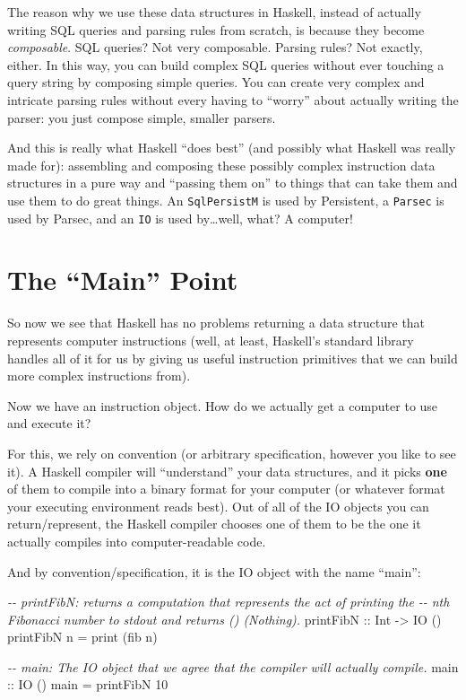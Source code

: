 \documentclass[]{article}
\newenvironment{Shaded}{}{}
\newcommand{\CommentTok}[1]{\textcolor[rgb]{0.38,0.63,0.69}{\textit{#1}}}
\newcommand{\DataTypeTok}[1]{\textcolor[rgb]{0.56,0.13,0.00}{#1}}
\newcommand{\DecValTok}[1]{\textcolor[rgb]{0.25,0.63,0.44}{#1}}
\newcommand{\FunctionTok}[1]{\textcolor[rgb]{0.02,0.16,0.49}{#1}}
\newcommand{\NormalTok}[1]{#1}
\newcommand{\OtherTok}[1]{\textcolor[rgb]{0.00,0.44,0.13}{#1}}
\begin{document}
The reason why we use these data structures in Haskell, instead of actually
writing SQL queries and parsing rules from scratch, is because they become
\emph{composable}. SQL queries? Not very composable. Parsing rules? Not exactly,
either. In this way, you can build complex SQL queries without ever touching a
query string by composing simple queries. You can create very complex and
intricate parsing rules without every having to ``worry'' about actually writing
the parser: you just compose simple, smaller parsers.

And this is really what Haskell ``does best'' (and possibly what Haskell was
really made for): assembling and composing these possibly complex instruction
data structures in a pure way and ``passing them on'' to things that can take
them and use them to do great things. An \texttt{SqlPersistM} is used by
Persistent, a \texttt{Parsec} is used by Parsec, and an \texttt{IO} is used
by\ldots well, what? A computer!

\section{The ``Main'' Point}\label{the-main-point}

So now we see that Haskell has no problems returning a data structure that
represents computer instructions (well, at least, Haskell's standard library
handles all of it for us by giving us useful instruction primitives that we can
build more complex instructions from).

Now we have an instruction object. How do we actually get a computer to use and
execute it?

For this, we rely on convention (or arbitrary specification, however you like to
see it). A Haskell compiler will ``understand'' your data structures, and it
picks \textbf{one} of them to compile into a binary format for your computer (or
whatever format your executing environment reads best). Out of all of the IO
objects you can return/represent, the Haskell compiler chooses one of them to be
the one it actually compiles into computer-readable code.

And by convention/specification, it is the IO object with the name ``main'':

\begin{Shaded}
\begin{Highlighting}[]
\CommentTok{{-}{-}  printFibN: returns a computation that represents the act of printing the}
\CommentTok{{-}{-}      nth Fibonacci number to stdout and returns () (Nothing).}
\OtherTok{printFibN ::} \DataTypeTok{Int} \OtherTok{{-}\textgreater{}} \DataTypeTok{IO}\NormalTok{ ()}
\NormalTok{printFibN n }\OtherTok{=} \FunctionTok{print}\NormalTok{ (fib n)}

\CommentTok{{-}{-}  main: The IO object that we agree that the compiler will actually compile.}
\OtherTok{main ::} \DataTypeTok{IO}\NormalTok{ ()}
\NormalTok{main }\OtherTok{=}\NormalTok{ printFibN }\DecValTok{10}
\end{Highlighting}
\end{Shaded}
\end{document}
